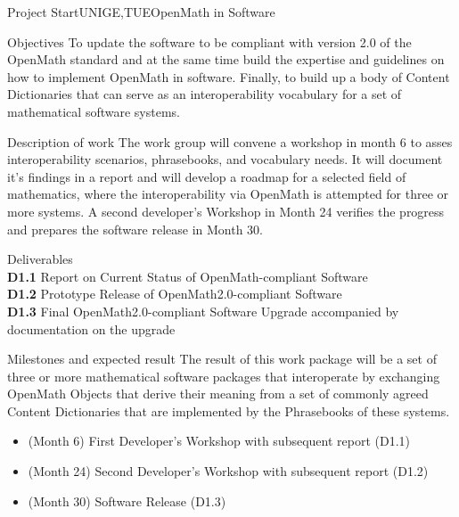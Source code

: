 \documentclass{euproposal}
\begin{document}
\begin{workpackage}{36}{1}{Project Start}{UNIGE,TUE}{OpenMath in Software}
\begin{wpbox}{Objectives}
  To update the software to be compliant with version 2.0 of the OpenMath standard
  and at the same time build the expertise and guidelines on how to implement
  OpenMath in software. Finally, to build up a body of Content Dictionaries that
  can serve as an interoperability vocabulary for a set of mathematical software
  systems.
\end{wpbox}
\begin{wpbox}{Description of work}
  The work group will convene a workshop in month 6 to asses interoperability
  scenarios, phrasebooks, and vocabulary needs. It will document it's findings in
  a report and will develop a roadmap for a selected field of mathematics, where
  the interoperability via OpenMath is attempted for three or more systems. A
  second developer's Workshop in Month 24 verifies the progress and prepares the
  software release in Month 30.
\end{wpbox}
\begin{wpbox}{Deliverables\\}
  {\bf D1.1} Report on Current Status of OpenMath-compliant Software\\
  {\bf D1.2} Prototype Release of OpenMath2.0-compliant Software\\
  {\bf D1.3} Final OpenMath2.0-compliant Software Upgrade accompanied
  by documentation on the upgrade
\end{wpbox}
\begin{wpbox}{Milestones and expected result}
  The result of this work package will be a set of three or more mathematical
  software packages that interoperate by exchanging OpenMath Objects that derive
  their meaning from a set of commonly agreed Content Dictionaries that are
  implemented by the Phrasebooks of these systems.
\begin{itemize}
\item (Month 6) First Developer's Workshop with subsequent report (D1.1)
\item (Month 24) Second Developer's Workshop with subsequent report (D1.2)
\item (Month 30) Software Release (D1.3)
\end{itemize}
\end{wpbox}
\end{workpackage}
\newpage
\end{document}
